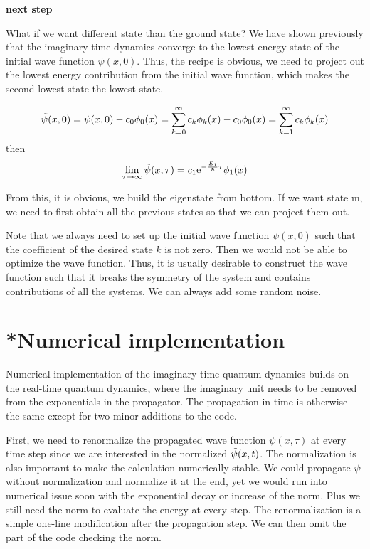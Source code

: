 \textbf{next step}

What if we want  different state than the ground state? We have shown previously that the imaginary-time dynamics  converge to the lowest energy state of the initial wave function $\psi(x,0)$.
Thus, the recipe is obvious, we need to project out the lowest energy contribution from the initial wave function, which makes the second lowest state the lowest state.

\begin{equation}
    \Tilde{\psi}(x,0) = \psi(x,0) - c_0 \phi_0(x) = \sum_{k=0}^\infty c_k \phi_k(x) - c_0 \phi_0(x) = \sum_{k=1}^\infty c_k \phi_k(x)
\end{equation}
then
\begin{equation}
    \lim_{\tau\to\infty} \Tilde{\psi}(x,\tau) = c_1  \mathrm{e}^{-\frac{E_1}{\hbar}\tau} \phi_1(x)
\end{equation}

From this, it is obvious, we build the eigenstate from bottom. If we want state m, we need to first obtain all the previous states so that we can project them out. 

Note that we always need to set up the initial wave function $\psi(x,0)$ such that the coefficient of the desired state $k$ is not zero. Then we would not be able to optimize the wave function. Thus, it is usually desirable to construct the wave function such that it breaks the symmetry of the system and contains contributions of all the systems. We can always add some random noise.

\section{*Numerical implementation}

Numerical implementation of the imaginary-time quantum dynamics builds on the real-time quantum dynamics, where the imaginary unit needs to be removed from the exponentials in the propagator. The propagation in time is otherwise the same except for two minor additions to the code.

First, we need to renormalize the propagated wave function $\psi(x,\tau)$ at every time step since we are interested in the normalized $\Tilde{\psi}(x,t)$. The normalization is also important to make the calculation numerically stable. We could propagate $\psi$ without normalization and normalize it at the end, yet we would run into numerical issue soon with the exponential decay or increase of the norm. Plus we still need the norm to evaluate the energy at every step. The renormalization is a simple one-line modification after the propagation step. We can then omit the part of the code checking the norm.

